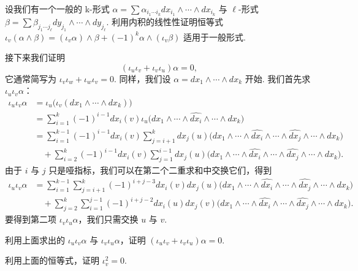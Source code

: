 \begin{question}\label{q:3-25}
设我们有一个一般的 k-形式 $\alpha=\sum\alpha_{i_1\cdots i_k}dx_{i_1}\wedge\cdots\wedge dx_{i_k}$ 与 $\ell$-形式 $\beta=\sum\beta_{j_1\cdots j_\ell}dy_{j_1}\wedge\cdots\wedge dy_{j_\ell}$. 利用内积的线性性证明恒等式 $\iota_v(\alpha\wedge\beta)=(\iota_v\alpha)\wedge\beta+(-1)^k\alpha\wedge(\iota_v\beta)$ 适用于一般形式.
\end{question}

接下来我们证明
\[
(\iota_u\iota_v+\iota_v\iota_u)\alpha=0,
\]
它通常简写为 $\iota_v\iota_w+\iota_w\iota_v=0$. 同样，我们设 $\alpha=dx_1\wedge\cdots\wedge dx_k$ 开始. 我们首先求 $\iota_u\iota_v\alpha$：
\begin{align*}
\iota_u\iota_v\alpha&=\iota_u\bigl(\iota_v(dx_1\wedge\cdots\wedge dx_k)\bigr)\\
&=\sum_{i=1}^{k}(-1)^{i-1}dx_i(v)\iota_u\bigl(dx_1\wedge\cdots\wedge\widehat{dx_i}\wedge\cdots\wedge dx_k\bigr)\\
&=\sum_{i=1}^{k-1}(-1)^{i-1}dx_i(v)\sum_{j=i+1}^{k}dx_j(u)\bigl(dx_1\wedge\cdots\wedge\widehat{dx_i}\wedge\cdots\wedge\widehat{dx_j}\wedge\cdots\wedge dx_k\bigr)\\
&\quad+\sum_{i=2}^{k}(-1)^{i-1}dx_i(v)\sum_{j=1}^{i-1}dx_j(u)\bigl(dx_1\wedge\cdots\wedge\widehat{dx_i}\wedge\cdots\wedge\widehat{dx_j}\wedge\cdots\wedge dx_k\bigr).
\end{align*}
由于 $i$ 与 $j$ 只是哑指标，我们可以在第二个二重求和中交换它们，得到
\begin{align*}
\iota_u\iota_v\alpha&=\sum_{i=1}^{k-1}\sum_{j=i+1}^{k}(-1)^{i+j-3}dx_i(v)dx_j(u)\bigl(dx_1\wedge\cdots\wedge\widehat{dx_i}\wedge\cdots\wedge\widehat{dx_j}\wedge\cdots\wedge dx_k\bigr)\\
&\quad+\sum_{j=2}^{k}\sum_{i=1}^{j-1}(-1)^{i+j-2}dx_i(u)dx_j(v)\bigl(dx_1\wedge\cdots\wedge\widehat{dx_i}\wedge\cdots\wedge\widehat{dx_j}\wedge\cdots\wedge dx_k\bigr).
\end{align*}
要得到第二项 $\iota_v\iota_u\alpha$，我们只需交换 $u$ 与 $v$.

\begin{question}\label{q:3-26}
利用上面求出的 $\iota_u\iota_v\alpha$ 与 $\iota_v\iota_u\alpha$，证明 $(\iota_u\iota_v+\iota_v\iota_u)\alpha=0$.
\end{question}

\begin{question}\label{q:3-27}
利用上面的恒等式，证明 $\iota_v^2=0$.
\end{question}

